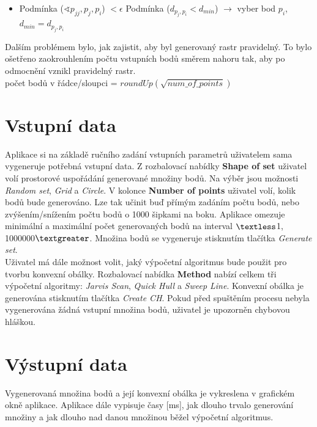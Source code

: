 \documentclass[a4paper, 12pt]{article}
\begin{document}
\begin{itemize}
\item Podmínka ($\sphericalangle p_{jj}, p_j, p_i$) $< \epsilon$
\subitem Podmínka ($d_{p_j,p_i} < d_{min}$) $\rightarrow$ vyber bod $p_i$, $d_{min} = d_{p_j,p_i}$
\end{itemize}

Dalším problémem bylo, jak zajistit, aby byl generovaný rastr pravidelný. To bylo ošetřeno zaokrouhlením počtu vstupních bodů směrem nahoru tak, aby po odmocnění vznikl pravidelný rastr.\\

počet bodů v řádce/sloupci = $roundUp(\sqrt{num\_of\_points})$

\section{Vstupní data}
Aplikace si na základě ručního zadání vstupních parametrů uživatelem sama vygeneruje potřebná vstupní data. Z rozbalovací nabídky \textbf{Shape of set} uživatel volí prostorové uspořádání generované množiny bodů. Na výběr jsou možnosti \textit{Random set}, \textit{Grid} a \textit{Circle}. V kolonce \textbf{Number of points} uživatel volí, kolik bodů bude generováno. Lze tak učinit buď přímým zadáním počtu bodů, nebo zvýšením/snížením počtu bodů o 1000 šipkami na boku. Aplikace omezuje minimální a maximální počet generovaných bodů na interval $\textless$1, 1000000$\textgreater$. Množina bodů se vygeneruje stisknutím tlačítka \textsl{Generate set}.\\

Uživatel má dále možnost volit, jaký výpočetní algoritmus bude použit pro tvorbu konvexní obálky. Rozbalovací nabídka \textbf{Method} nabízí celkem tři výpočetní algoritmy: \textit{Jarvis Scan}, \textit{Quick Hull} a \textit{Sweep Line}. Konvexní obálka je generována stisknutím tlačítka \textsl{Create CH}. Pokud před spuštěním procesu nebyla vygenerována žádná vstupní množina bodů, uživatel je upozorněn chybovou hláškou. 

\section{Výstupní data}
Vygenerovaná množina bodů a její konvexní obálka je vykreslena v grafickém okně aplikace. Aplikace dále vypisuje časy [ms], jak dlouho trvalo generování množiny a jak dlouho nad danou množinou běžel výpočetní algoritmus.\\
\end{document}
